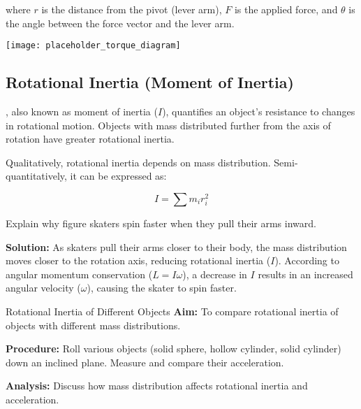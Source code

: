 where \( r \) is the distance from the pivot (lever arm), \( F \) is the applied force, and \( \theta \) is the angle between the force vector and the lever arm.

\begin{marginfigure}[0pt]
\texttt{[image: placeholder\_torque\_diagram]}
\caption{Torque depends on the magnitude of force, distance from pivot, and angle of application.}
\end{marginfigure}

\subsection{Rotational Inertia (Moment of Inertia)}
\FloatBarrier

, also known as moment of inertia (\(I\)), quantifies an object's resistance to changes in rotational motion. Objects with mass distributed further from the axis of rotation have greater rotational inertia.

Qualitatively, rotational inertia depends on mass distribution. Semi-quantitatively, it can be expressed as:

\[
I = \sum m_i r_i^2
\]


\begin{example}
Explain why figure skaters spin faster when they pull their arms inward.

\textbf{Solution:}
As skaters pull their arms closer to their body, the mass distribution moves closer to the rotation axis, reducing rotational inertia (\(I\)). According to angular momentum conservation (\(L = I \omega\)), a decrease in \(I\) results in an increased angular velocity (\(\omega\)), causing the skater to spin faster.
\end{example}

\begin{investigation}{Rotational Inertia of Different Objects}
\textbf{Aim:} To compare rotational inertia of objects with different mass distributions.

\textbf{Procedure:}
Roll various objects (solid sphere, hollow cylinder, solid cylinder) down an inclined plane. Measure and compare their acceleration.

\textbf{Analysis:} Discuss how mass distribution affects rotational inertia and acceleration.
\end{investigation}

